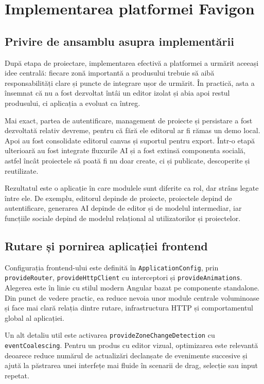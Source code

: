 \chapter{Implementarea platformei Favigon}

\section{Privire de ansamblu asupra implementării}

După etapa de proiectare, implementarea efectivă a platformei a urmărit aceeași idee centrală: fiecare zonă importantă a produsului trebuie să aibă responsabilități clare și puncte de integrare ușor de urmărit. În practică, asta a însemnat că nu a fost dezvoltat întâi un editor izolat și abia apoi restul produsului, ci aplicația a evoluat ca întreg.

Mai exact, partea de autentificare, management de proiecte și persistare a fost dezvoltată relativ devreme, pentru că fără ele editorul ar fi rămas un demo local. Apoi au fost consolidate editorul canvas și suportul pentru export. Într-o etapă ulterioară au fost integrate fluxurile AI și a fost extinsă componenta socială, astfel încât proiectele să poată fi nu doar create, ci și publicate, descoperite și reutilizate.

Rezultatul este o aplicație în care modulele sunt diferite ca rol, dar strâns legate între ele. De exemplu, editorul depinde de proiecte, proiectele depind de autentificare, generarea AI depinde de editor și de modelul intermediar, iar funcțiile sociale depind de modelul relațional al utilizatorilor și proiectelor.

\section{Rutare și pornirea aplicației frontend}

Configurația frontend-ului este definită în \texttt{ApplicationConfig}, prin \texttt{provideRouter}, \texttt{provideHttpClient} cu interceptori și \texttt{provideAnimations}. Alegerea este în linie cu stilul modern Angular bazat pe componente standalone. Din punct de vedere practic, ea reduce nevoia unor module centrale voluminoase și face mai clară relația dintre rutare, infrastructura HTTP și comportamentul global al aplicației.

Un alt detaliu util este activarea \texttt{provideZoneChangeDetection} cu \texttt{eventCoalescing}. Pentru un produs cu editor vizual, optimizarea este relevantă deoarece reduce numărul de actualizări declanșate de evenimente succesive și ajută la păstrarea unei interfețe mai fluide în scenarii de drag, selecție sau input repetat.

